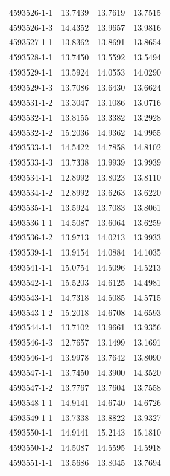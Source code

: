 \begin{longtable}{lrrr}
4593526-1-1 & 13.7439 & 13.7619 & 13.7515 \\
4593526-1-3 & 14.4352 & 13.9657 & 13.9816 \\
4593527-1-1 & 13.8362 & 13.8691 & 13.8654 \\
4593528-1-1 & 13.7450 & 13.5592 & 13.5494 \\
4593529-1-1 & 13.5924 & 14.0553 & 14.0290 \\
4593529-1-3 & 13.7086 & 13.6430 & 13.6624 \\
4593531-1-2 & 13.3047 & 13.1086 & 13.0716 \\
4593532-1-1 & 13.8155 & 13.3382 & 13.2928 \\
4593532-1-2 & 15.2036 & 14.9362 & 14.9955 \\
4593533-1-1 & 14.5422 & 14.7858 & 14.8102 \\
4593533-1-3 & 13.7338 & 13.9939 & 13.9939 \\
4593534-1-1 & 12.8992 & 13.8023 & 13.8110 \\
4593534-1-2 & 12.8992 & 13.6263 & 13.6220 \\
4593535-1-1 & 13.5924 & 13.7083 & 13.8061 \\
4593536-1-1 & 14.5087 & 13.6064 & 13.6259 \\
4593536-1-2 & 13.9713 & 14.0213 & 13.9933 \\
4593539-1-1 & 13.9154 & 14.0884 & 14.1035 \\
4593541-1-1 & 15.0754 & 14.5096 & 14.5213 \\
4593542-1-1 & 15.5203 & 14.6125 & 14.4981 \\
4593543-1-1 & 14.7318 & 14.5085 & 14.5715 \\
4593543-1-2 & 15.2018 & 14.6708 & 14.6593 \\
4593544-1-1 & 13.7102 & 13.9661 & 13.9356 \\
4593546-1-3 & 12.7657 & 13.1499 & 13.1691 \\
4593546-1-4 & 13.9978 & 13.7642 & 13.8090 \\
4593547-1-1 & 13.7450 & 14.3900 & 14.3520 \\
4593547-1-2 & 13.7767 & 13.7604 & 13.7558 \\
4593548-1-1 & 14.9141 & 14.6740 & 14.6726 \\
4593549-1-1 & 13.7338 & 13.8822 & 13.9327 \\
4593550-1-1 & 14.9141 & 15.2143 & 15.1810 \\
4593550-1-2 & 14.5087 & 14.5595 & 14.5918 \\
4593551-1-1 & 13.5686 & 13.8045 & 13.7694 \\

\end{longtable}
